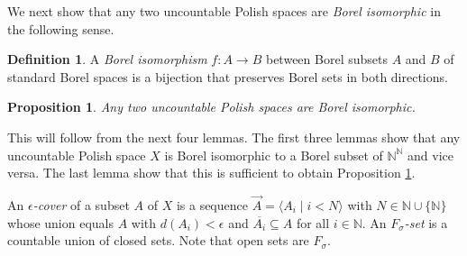 \documentclass[10pt]{amsart}
\newcommand{\RR}{\mathbb{R}}
\newcommand{\NN}{\mathbb{N}}
\newtheorem{proposition}[theorem]{Proposition}
\theoremstyle{definition}
\newtheorem{definition}[theorem]{Definition}
\theoremstyle{remark}
\newenvironment{enumerate-(a)}{\begin{enumerate}[label={\upshape (\alph*)}, leftmargin=2pc]}{\end{enumerate}}
\begin{document}
\bigskip 
We next show that any two uncountable Polish spaces are \emph{Borel isomorphic} in the following sense. 

\begin{definition} 
A \emph{Borel isomorphism} $f\colon A\rightarrow B$ between Borel subsets $A$ and $B$ of standard Borel spaces is a bijection that preserves Borel sets in both directions. 
\end{definition} 

\begin{proposition} \label{Borel isomorphism of Polish spaces} 
Any two uncountable Polish spaces are Borel isomorphic. 
\end{proposition} 

This will follow from the next four lemmas. The first three lemmas show that any uncountable Polish space $X$ is Borel isomorphic to a Borel subset of $\NN^\NN$ and vice versa. The last lemma show that this is sufficient to obtain Proposition \ref{Borel isomorphism of Polish spaces}. 

An \emph{$\epsilon$-cover} of a subset $A$ of $X$ is a sequence $\vec{A}=\langle A_i\mid i<N\rangle$ with $N\in \NN\cup\{\NN\}$ whose union equals $A$ with $d(A_i)<\epsilon$ and $\overline{A_i}\subseteq A$ for all $i\in\NN$. 
An \emph{$F_\sigma$-set} is a countable union of closed sets. 
Note that open sets are $F_\sigma$. 
\end{document}
